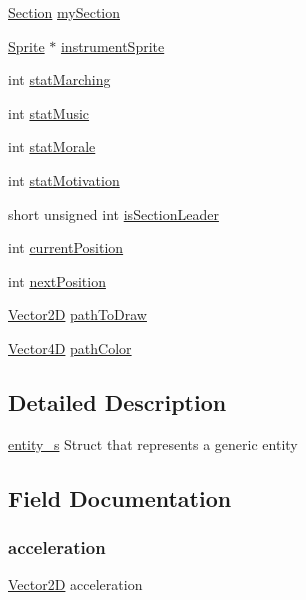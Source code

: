 \begin{DoxyCompactItemize}
\hyperlink{entity__s_8h_a74c066b9a2662a48095c47acf5debac4}{Section} \hyperlink{structentity__s_ad81be2aae4b919dfe48fcee74129eb10}{my\+Section}
\item 
\hyperlink{gf2d__sprite_8h_a85b5a622f08c587d1f33fd504a24416e}{Sprite} $\ast$ \hyperlink{structentity__s_a516cbd18313c08e3a86792d9945dd4fb}{instrument\+Sprite}
\item 
int \hyperlink{structentity__s_a2f5d2a226adffc3719a826f610de9be2}{stat\+Marching}
\item 
int \hyperlink{structentity__s_ae5341e0b53331ca3c7e81726895e68fa}{stat\+Music}
\item 
int \hyperlink{structentity__s_ae988c5b9868840a73604a8d281c650ef}{stat\+Morale}
\item 
int \hyperlink{structentity__s_ab44ea035652247e02518c0080e884c64}{stat\+Motivation}
\item 
short unsigned int \hyperlink{structentity__s_ace21314f7800da6d1b36dd730eba6e05}{is\+Section\+Leader}
\item 
int \hyperlink{structentity__s_aa662efe820ee154e4fc6e5ef1a5af99a}{current\+Position}
\item 
int \hyperlink{structentity__s_a3ce77101c89cf9167be88f050bd42f72}{next\+Position}
\item 
\hyperlink{struct_vector2_d}{Vector2D} \hyperlink{structentity__s_af06b629e4b5c3f2d9070ff0c4e3907a0}{path\+To\+Draw}
\item 
\hyperlink{struct_vector4_d}{Vector4D} \hyperlink{structentity__s_acc5d76b31818103e5e1b83cbc193e613}{path\+Color}
\end{DoxyCompactItemize}


\subsection{Detailed Description}
\hyperlink{structentity__s}{entity\+\_\+s} Struct that represents a generic entity 

\subsection{Field Documentation}
\mbox{\label{structentity__s_af4d83cb71edc9f387519fb3c7669f9bd}} 
\subsubsection{\texorpdfstring{acceleration}{acceleration}}
{\footnotesize\ttfamily \hyperlink{struct_vector2_d}{Vector2D} acceleration}



